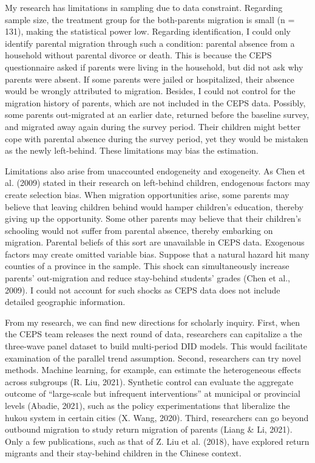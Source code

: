 \documentclass[
  man,floatsintext]{apa7}
\begin{document}
My research has limitations in sampling due to data constraint. Regarding sample size, the treatment group for the both-parents migration is small (n = 131), making the statistical power low. Regarding identification, I could only identify parental migration through such a condition: parental absence from a household without parental divorce or death. This is because the CEPS questionnaire asked if parents were living in the household, but did not ask why parents were absent. If some parents were jailed or hospitalized, their absence would be wrongly attributed to migration. Besides, I could not control for the migration history of parents, which are not included in the CEPS data. Possibly, some parents out-migrated at an earlier date, returned before the baseline survey, and migrated away again during the survey period. Their children might better cope with parental absence during the survey period, yet they would be mistaken as the newly left-behind. These limitations may bias the estimation.

Limitations also arise from unaccounted endogeneity and exogeneity. As Chen et al. (2009) stated in their research on left-behind children, endogenous factors may create selection bias. When migration opportunities arise, some parents may believe that leaving children behind would hamper children's education, thereby giving up the opportunity. Some other parents may believe that their children's schooling would not suffer from parental absence, thereby embarking on migration. Parental beliefs of this sort are unavailable in CEPS data. Exogenous factors may create omitted variable bias. Suppose that a natural hazard hit many counties of a province in the sample. This shock can simultaneously increase parents' out-migration and reduce stay-behind students' grades (Chen et al., 2009). I could not account for such shocks as CEPS data does not include detailed geographic information.

From my research, we can find new directions for scholarly inquiry. First, when the CEPS team releases the next round of data, researchers can capitalize a the three-wave panel dataset to build multi-period DID models. This would facilitate examination of the parallel trend assumption. Second, researchers can try novel methods. Machine learning, for example, can estimate the heterogeneous effects across subgroups (R. Liu, 2021). Synthetic control can evaluate the aggregate outcome of ``large-scale but infrequent interventions'' at municipal or provincial levels (Abadie, 2021), such as the policy experimentations that liberalize the hukou system in certain cities (X. Wang, 2020). Third, researchers can go beyond outbound migration to study return migration of parents (Liang \& Li, 2021). Only a few publications, such as that of Z. Liu et al. (2018), have explored return migrants and their stay-behind children in the Chinese context.
\end{document}
